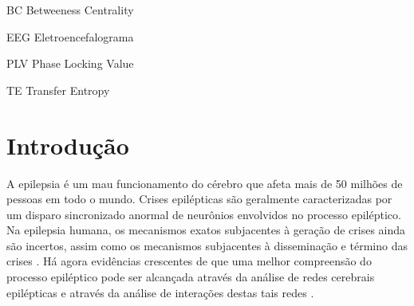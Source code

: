 \documentclass[
	12pt,				%
	openright,			%
	twoside,			%
	a4paper,			%
	english,			%
	french,				%
	spanish,			%
	brazil				%
	]{abntex2}
\begin{document}
\listoffigures*
\cleardoublepage

\listoftables*
\cleardoublepage

\begin{siglas}
  \item[BC] Betweeness Centrality
  \item[EEG] Eletroencefalograma
  \item[PLV] Phase Locking Value
  \item[TE] Transfer Entropy
\end{siglas}


\tableofcontents*
\cleardoublepage



\textual

\chapter*[Introdução]{Introdução}
A epilepsia é um mau funcionamento do cérebro que afeta mais de 50 milhões de
pessoas em todo o mundo. Crises epilépticas são geralmente caracterizadas por um disparo sincronizado anormal de neurônios envolvidos no processo epiléptico. Na epilepsia humana, os mecanismos exatos subjacentes à geração de crises ainda são incertos, assim como os mecanismos subjacentes à disseminação e término das crises \cite{lehnertz2009synchronization}. Há agora evidências crescentes de que uma melhor compreensão do processo epiléptico pode ser alcançada através da análise de redes cerebrais epilépticas e através da análise de interações destas tais redes \cite{boccaletti2001unifying}.
\end{document}
